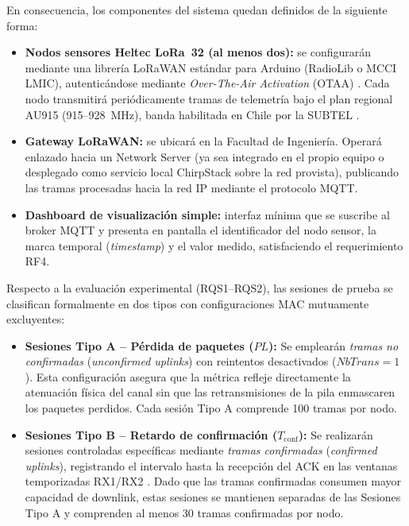 \documentclass[12pt,oneside,openany,spanish,oldfontcommands]{memoir}
\begin{document}
En consecuencia, los componentes del sistema quedan definidos de la siguiente forma:

\begin{itemize}
  \item \textbf{Nodos sensores Heltec LoRa~32 (al menos dos):} se configurarán mediante una
  librería LoRaWAN estándar para Arduino (RadioLib o MCCI LMIC), autenticándose mediante
  \emph{Over-The-Air Activation} (OTAA) \parencite{lorawan1_0_4}. Cada nodo transmitirá
  periódicamente tramas de telemetría bajo el plan regional AU915 (915--928~MHz), banda
  habilitada en Chile por la SUBTEL \parencite{subtel2017}.
  \item \textbf{Gateway LoRaWAN:} se ubicará en la Facultad de Ingeniería. Operará enlazado
  hacia un Network Server (ya sea integrado en el propio equipo o desplegado como servicio local
  ChirpStack sobre la red provista), publicando las tramas procesadas hacia la red IP
  mediante el protocolo MQTT.
  \item \textbf{Dashboard de visualización simple:} interfaz mínima que se suscribe al broker
  MQTT y presenta en pantalla el identificador del nodo sensor, la marca temporal
  (\emph{timestamp}) y el valor medido, satisfaciendo el requerimiento RF4.
\end{itemize}

Respecto a la evaluación experimental (RQS1--RQS2), las sesiones de prueba se clasifican
formalmente en dos tipos con configuraciones MAC mutuamente excluyentes:

\begin{itemize}
  \item \textbf{Sesiones Tipo A -- Pérdida de paquetes ($PL$):} Se emplearán
  \emph{tramas no confirmadas} (\textit{unconfirmed uplinks}) con reintentos desactivados
  ($NbTrans = 1$). Esta configuración asegura que la métrica refleje directamente la
  atenuación física del canal sin que las retransmisiones de la pila enmascaren los paquetes
  perdidos. Cada sesión Tipo A comprende 100 tramas por nodo.

  \item \textbf{Sesiones Tipo B -- Retardo de confirmación ($T_{\mathrm{conf}}$):} Se
  realizarán sesiones controladas específicas mediante \emph{tramas confirmadas}
  (\textit{confirmed uplinks}), registrando el intervalo hasta la recepción del ACK en las
  ventanas temporizadas RX1/RX2 \parencite{lorawan1_0_4}. Dado que las tramas confirmadas
  consumen mayor capacidad de downlink, estas sesiones se mantienen separadas de las
  Sesiones Tipo A y comprenden al menos 30 tramas confirmadas por nodo.
\end{itemize}
\end{document}
